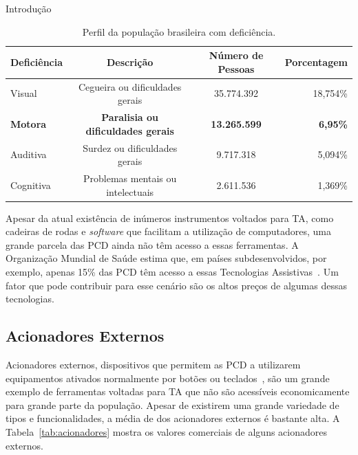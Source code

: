 \begin{chapter}{Introdução}
\begin{table}[!h]
\centering
\caption{Perfil da população brasileira com deficiência.}
\label{tab:ibge}
\def\arraystretch{1}
\begin{tabular}{lccr}
	\hline
	\hline
	\textbf{Deficiência} & \textbf{Descrição} & \textbf{Número de Pessoas} &
\textbf{Porcentagem} \\
	\hline
	Visual    & Cegueira ou dificuldades gerais   & 35.774.392  & 18,754\%  \\
	\textbf{Motora}    & \textbf{Paralisia ou dificuldades gerais}  & \textbf{13.265.599}  & \textbf{6,95\%} \\
	Auditiva  & Surdez ou dificuldades gerais     & 9.717.318   &  5,094\%  \\
	Cognitiva & Problemas mentais ou intelectuais & 2.611.536   &  1,369\%  \\ 
	\hline
	\hline
\end{tabular}
\end{table} %

Apesar da atual existência de inúmeros instrumentos voltados para TA, como
cadeiras de rodas e \textit{software} que facilitam a utilização de
computadores, uma grande parcela das PCD ainda não têm acesso a essas
ferramentas. A Organização Mundial de Saúde estima que, em países
subdesenvolvidos, por exemplo, apenas 15\% das PCD têm acesso a essas Tecnologias
Assistivas~\cite{WHO15}. Um fator que pode contribuir para esse cenário são os
altos preços de algumas dessas tecnologias. 

\subsection{Acionadores Externos}

Acionadores externos, dispositivos que permitem as PCD a utilizarem
equipamentos ativados normalmente por botões ou teclados~\cite{tecla}, são um
grande exemplo de ferramentas voltadas para TA que não são acessíveis
economicamente para grande parte da população. Apesar de existirem uma grande 
variedade de tipos e funcionalidades, a média de dos acionadores externos
é bastante alta. A Tabela~\ref{tab:acionadores} mostra os valores comerciais 
de alguns  acionadores externos. 


\end{chapter}

